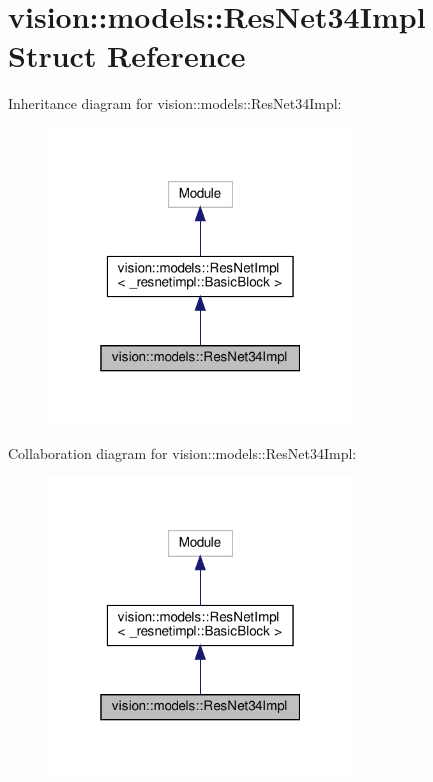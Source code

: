\hypertarget{structvision_1_1models_1_1ResNet34Impl}{}\section{vision\+:\+:models\+:\+:Res\+Net34\+Impl Struct Reference}
\label{structvision_1_1models_1_1ResNet34Impl}


Inheritance diagram for vision\+:\+:models\+:\+:Res\+Net34\+Impl\+:
\nopagebreak
\begin{figure}[H]
\begin{center}
\leavevmode
\includegraphics[width=229pt]{structvision_1_1models_1_1ResNet34Impl__inherit__graph}
\end{center}
\end{figure}


Collaboration diagram for vision\+:\+:models\+:\+:Res\+Net34\+Impl\+:
\nopagebreak
\begin{figure}[H]
\begin{center}
\leavevmode
\includegraphics[width=229pt]{structvision_1_1models_1_1ResNet34Impl__coll__graph}
\end{center}
\end{figure}
